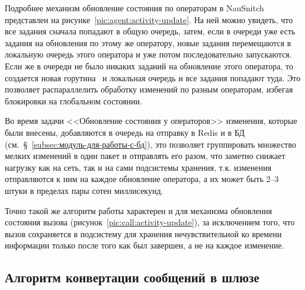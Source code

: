 Подробнее механизм обновление состояния по операторам в NauSnitch представлен на рисунке~\ref{pic:agent:activity-update}.
На ней можно увидеть, что все задания сначала попадают в общую очередь,
затем, если в очереди уже есть задания на обновления по этому же оператору,
новые задания перемещаются в локальную очередь этого оператора и уже потом последовательно запускаются.
Если же в очереди не было никаких заданий на обновление этого оператора,
то создается новая горутина~\cite{Whygoroutinesarenotlightweightthreads,Goroutines,goroutineallabout} и локальная очередь и все задания попадают туда.
Это позволяет распараллелить обработку изменений по разным операторам,
избегая блокировки на глобальном состоянии.

Во время задачи <<Обновление состояния у операторов>>
изменения, которые были внесены, добавляются в очередь на отправку в Redis и в БД (см.~\S~\ref{subsec:модуль-для-работы-с-бд}),
это позволяет группировать множество мелких изменений в один пакет и отправлять его разом,
что заметно снижает нагрузку как на сеть, так и на сами подсистемы хранения,
т.к. изменения отправляются к ним на каждое обновление оператора, а их может быть 2--3 штуки в пределах пары сотен миллисекунд.

Точно такой же алгоритм работы характерен и для механизма обновления состояния вызова (рисунок~\ref{pic:call:activity-update}),
за исключением того,
что вызов сохраняется в подсистему для хранения нечувствительной ко времени информации только после того как был завершен,
а не на каждое изменение.



\subsection{Алгоритм конвертации сообщений в шлюзе}\label{subsec:алгоритм-конвертации-сообщений-в-шлюзе}

